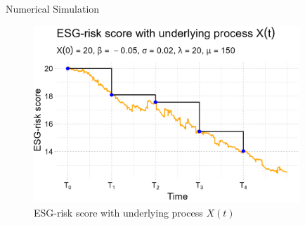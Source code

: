 \documentclass[UKenglish]{beamer}
\begin{document}
\begin{frame}{Numerical Simulation}
\begin{figure}[htp]
    \centering
    \includegraphics[width=10cm]{ESG/ESG_OU_path.png}
    \caption{ESG-risk score with underlying process $X(t)$}
    \label{fig: ESG_risk_score_underlying_X(t)}
\end{figure}
\end{frame}

\end{document}
